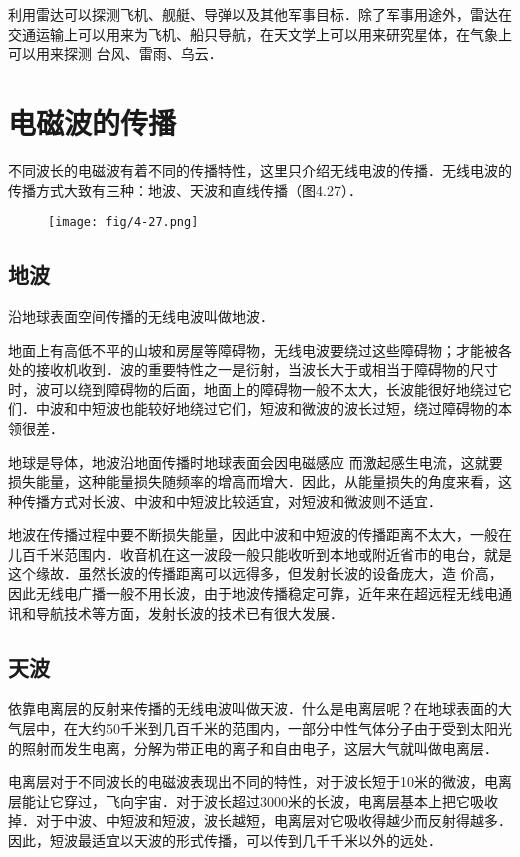 利用雷达可以探测飞机、舰艇、导弹以及其他军事目标．除了军事用途外，雷达在交通运输上可以用来为飞机、船只导航，在天文学上可以用来研究星体，在气象上可以用来探测
台风、雷雨、乌云．

\section{电磁波的传播}
不同波长的电磁波有着不同的传播特性，这里只介绍无线电波的传播．无线电波的传播方式大致有三种：地波、天波和直线传播（图4.27）．
\begin{figure}[htp]\centering
	\texttt{[image: fig/4-27.png]}
	\caption{}
	\end{figure}

\subsection{地波}

沿地球表面空间传播的无线电波叫做地波．

地面上有高低不平的山坡和房屋等障碍物，无线电波要绕过这些障碍物；才能被各处的接收机收到．波的重要特性之一是衍射，当波长大于或相当于障碍物的尺寸时，波可以绕到障碍物的后面，地面上的障碍物一般不太大，长波能很好地绕过它们．中波和中短波也能较好地绕过它们，短波和微波的波长过短，绕过障碍物的本领很差．

地球是导体，地波沿地面传播时地球表面会因电磁感应
而激起感生电流，这就要损失能量，这种能量损失随频率的增高而增大．因此，从能量损失的角度来看，这种传播方式对长波、中波和中短波比较适宜，对短波和微波则不适宜．

地波在传播过程中要不断损失能量，因此中波和中短波的传播距离不太大，一般在儿百千米范围内．收音机在这一波段一般只能收听到本地或附近省市的电台，就是这个缘故．虽然长波的传播距离可以远得多，但发射长波的设备庞大，造
价高，因此无线电广播一般不用长波，由于地波传播稳定可靠，近年来在超远程无线电通讯和导航技术等方面，发射长波的技术已有很大发展．

\subsection{天波}

依靠电离层的反射来传播的无线电波叫做天波．什么是电离层呢？在地球表面的大气层中，在大约50千米到几百千米的范围内，一部分中性气体分子由于受到太阳光的照射而发生电离，分解为带正电的离子和自由电子，这层大气就叫做电离层．

电离层对于不同波长的电磁波表现出不同的特性，对于波长短于10米的微波，电离层能让它穿过，飞向宇宙．对于波长超过3000米的长波，电离层基本上把它吸收掉．对于中波、中短波和短波，波长越短，电离层对它吸收得越少而反射得越多．因此，短波最适宜以天波的形式传播，可以传到几千千米以外的远处．

